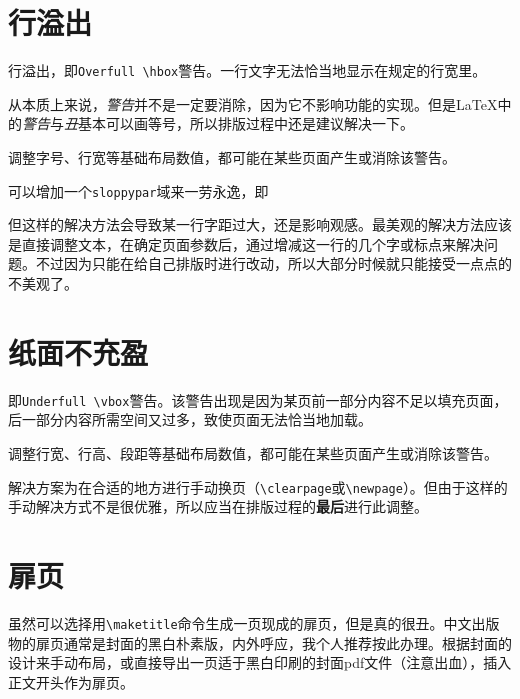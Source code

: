 \documentclass[10pt,openany]{book}
\begin{document}
\begin{sloppypar}
    

    \section{行溢出}

    行溢出，即\texttt{Overfull\ \textbackslash{}hbox}警告。一行文字无法恰当地显示在规定的行宽里。

    从本质上来说，\textit{警告}并不是一定要消除，因为它不影响功能的实现。但是{\LaTeX}中的\textit{警告}与\textit{丑}基本可以画等号，所以排版过程中还是建议解决一下。

    调整字号、行宽等基础布局数值，都可能在某些页面产生或消除该警告。

    可以增加一个\texttt{sloppypar}域来一劳永逸，即

    

    但这样的解决方法会导致某一行字距过大，还是影响观感。最美观的解决方法应该是直接调整文本，在确定页面参数后，通过增减这一行的几个字或标点来解决问题。不过因为只能在给自己排版时进行改动，所以大部分时候就只能接受一点点的不美观了。

    \section{纸面不充盈}

    即\texttt{Underfull\ \textbackslash{}vbox}警告。该警告出现是因为某页前一部分内容不足以填充页面，后一部分内容所需空间又过多，致使页面无法恰当地加载。

    调整行宽、行高、段距等基础布局数值，都可能在某些页面产生或消除该警告。

    解决方案为在合适的地方进行手动换页（\texttt{\textbackslash{}clearpage}或\texttt{\textbackslash{}newpage}）。但由于这样的手动解决方式不是很优雅，所以应当在排版过程的\textbf{最后}进行此调整。

    \section{扉页}

    虽然可以选择用\texttt{\textbackslash{}maketitle}命令生成一页现成的扉页，但是真的很丑。中文出版物的扉页通常是封面的黑白朴素版，内外呼应，我个人推荐按此办理。根据封面的设计来手动布局，或直接导出一页适于黑白印刷的封面pdf文件（注意出血），插入正文开头作为扉页。

    


\end{sloppypar}
\end{document}
